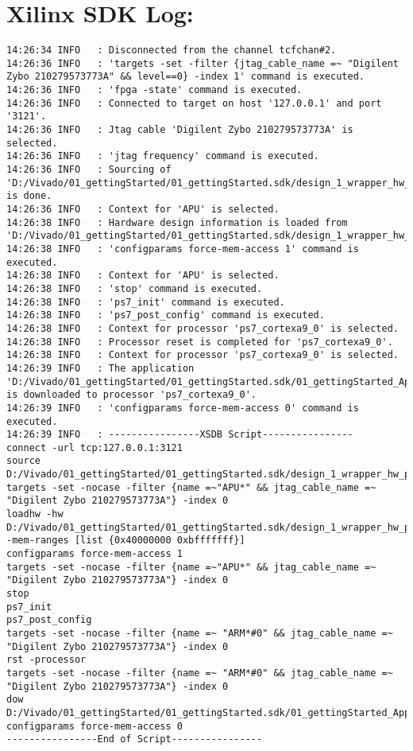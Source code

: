 \section{Xilinx SDK Log:}
\label{anhang:SDKLog}
\lstset{language=plain}
\begin{lstlisting}
14:26:34 INFO	: Disconnected from the channel tcfchan#2.
14:26:36 INFO	: 'targets -set -filter {jtag_cable_name =~ "Digilent Zybo 210279573773A" && level==0} -index 1' command is executed.
14:26:36 INFO	: 'fpga -state' command is executed.
14:26:36 INFO	: Connected to target on host '127.0.0.1' and port '3121'.
14:26:36 INFO	: Jtag cable 'Digilent Zybo 210279573773A' is selected.
14:26:36 INFO	: 'jtag frequency' command is executed.
14:26:36 INFO	: Sourcing of 'D:/Vivado/01_gettingStarted/01_gettingStarted.sdk/design_1_wrapper_hw_platform_0/ps7_init.tcl' is done.
14:26:36 INFO	: Context for 'APU' is selected.
14:26:38 INFO	: Hardware design information is loaded from 'D:/Vivado/01_gettingStarted/01_gettingStarted.sdk/design_1_wrapper_hw_platform_0/system.hdf'.
14:26:38 INFO	: 'configparams force-mem-access 1' command is executed.
14:26:38 INFO	: Context for 'APU' is selected.
14:26:38 INFO	: 'stop' command is executed.
14:26:38 INFO	: 'ps7_init' command is executed.
14:26:38 INFO	: 'ps7_post_config' command is executed.
14:26:38 INFO	: Context for processor 'ps7_cortexa9_0' is selected.
14:26:38 INFO	: Processor reset is completed for 'ps7_cortexa9_0'.
14:26:38 INFO	: Context for processor 'ps7_cortexa9_0' is selected.
14:26:39 INFO	: The application 'D:/Vivado/01_gettingStarted/01_gettingStarted.sdk/01_gettingStarted_ApplicationProject/Debug/01_gettingStarted_ApplicationProject.elf' is downloaded to processor 'ps7_cortexa9_0'.
14:26:39 INFO	: 'configparams force-mem-access 0' command is executed.
14:26:39 INFO	: ----------------XSDB Script----------------
connect -url tcp:127.0.0.1:3121
source D:/Vivado/01_gettingStarted/01_gettingStarted.sdk/design_1_wrapper_hw_platform_0/ps7_init.tcl
targets -set -nocase -filter {name =~"APU*" && jtag_cable_name =~ "Digilent Zybo 210279573773A"} -index 0
loadhw -hw D:/Vivado/01_gettingStarted/01_gettingStarted.sdk/design_1_wrapper_hw_platform_0/system.hdf -mem-ranges [list {0x40000000 0xbfffffff}]
configparams force-mem-access 1
targets -set -nocase -filter {name =~"APU*" && jtag_cable_name =~ "Digilent Zybo 210279573773A"} -index 0
stop
ps7_init
ps7_post_config
targets -set -nocase -filter {name =~ "ARM*#0" && jtag_cable_name =~ "Digilent Zybo 210279573773A"} -index 0
rst -processor
targets -set -nocase -filter {name =~ "ARM*#0" && jtag_cable_name =~ "Digilent Zybo 210279573773A"} -index 0
dow D:/Vivado/01_gettingStarted/01_gettingStarted.sdk/01_gettingStarted_ApplicationProject/Debug/01_gettingStarted_ApplicationProject.elf
configparams force-mem-access 0
----------------End of Script----------------


\end{lstlisting}

